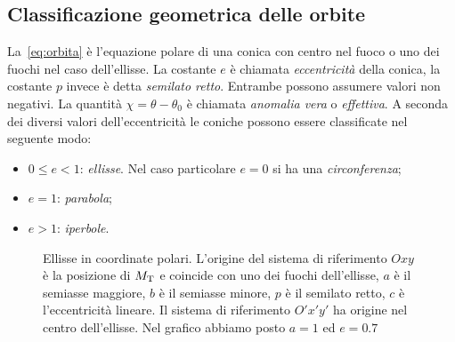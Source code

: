\subsection{Classificazione geometrica delle orbite}
\label{sec:class-geom-orbite}

La~\eqref{eq:orbita} è l'equazione polare di una conica con centro nel fuoco o
uno dei fuochi nel caso dell'ellisse. La costante $e$ è chiamata
\emph{eccentricità} della conica, la costante $p$ invece è detta
\emph{semilato retto}. Entrambe possono assumere valori non negativi. La
quantità $\chi = \theta - \theta_0$ è chiamata \emph{anomalia vera} o
\emph{effettiva}. A seconda dei diversi valori dell'eccentricità le coniche
possono essere classificate nel seguente modo:
\begin{itemize}
\item $0\leq e<1$: \emph{ellisse}. Nel caso particolare $e=0$ si ha una
  \emph{circonferenza};
\item $e=1$: \emph{parabola};
\item $e>1$: \emph{iperbole}.
\end{itemize}
\begin{figure}
  \centering
  
  \caption[Ellisse in coordinate polari]{Ellisse in coordinate polari. L'origine
    del sistema di riferimento $Oxy$ è la posizione di $M_\textup{T}$ e coincide
    con uno dei fuochi dell'ellisse, $a$ è il semiasse maggiore, $b$ è il
    semiasse minore, $p$ è il semilato retto, $c$ è l'eccentricità lineare. Il
    sistema di riferimento $O'x'y'$ ha origine nel centro dell'ellisse. Nel
    grafico abbiamo posto $a=1$ ed $e=0.7$}
  \label{fig:ellisse}
\end{figure}

